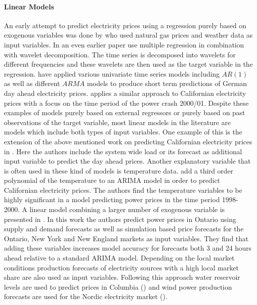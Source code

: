\paragraph{Linear Models}
An early attempt to predict electricity prices using a regression purely based on exogenous variables was done by \cite{schmutz_electricity_2004} who used natural gas prices and weather data as input variables. In an even earlier paper \cite{kim_prediction_2002} use multiple regression in combination with wavelet decomposition. The time series is decomposed into wavelets for different frequencies and these wavelets are then used as the target variable in the regression.
 \cite{crespo_cuaresma_forecasting_2004} have applied various univariate time series models including $AR(1)$ as well as different $ARMA$ models to produce short term predictions of German day ahead electricity prices. \cite{weron_forecasting_2005} applies a similar approach to Californian electricity prices with a focus on the time period of the power crash 2000/01.  
Despite these examples of models purely based on external regressors or purely based on past observations of the target variable, most linear models in the literature are models which include both types of input variables.
One example of this is the extension of the above mentioned work on predicting Californian electricity prices in \cite{misiorek_point_2006}. Here the authors include the system wide load or its forecast as additional input variable to predict the day ahead prices. Another explanatory variable that is often used in these kind of models is temperature data. \cite{knittel_empirical_2005} add a third order polynomial of the temperature to an ARIMA model in order to predict Californian electricity prices. The authors find the temperature variables to be highly significant in a model predicting power prices in the time period 1998-2000.  A linear model combining a larger number of exogenous variable is presented in \cite{zareipour_application_2006}. In this work the authors predict power prices in Ontario using supply and demand forecasts as well as simulation based price forecasts for the Ontario, New York and New England markets as input variables. They find that adding these variables increases model accuracy for forecasts both 3 and 24 hours ahead relative to a standard ARIMA model. Depending on the local market conditions production forecasts of electricity sources   with a high local market share are also used as input variables. Following this approach water reservoir levels are used to predict prices in Columbia (\cite{lira_short-term_2009}) and wind power production forecasts are used for the Nordic electricity market (\cite{kristiansen_forecasting_2012}).

